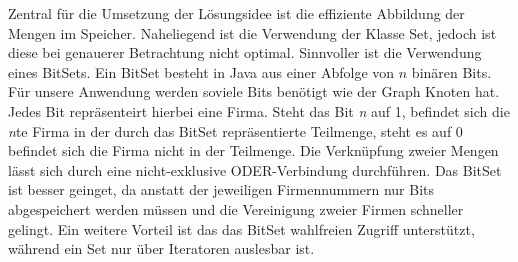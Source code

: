 Zentral für die Umsetzung der Lösungsidee ist die effiziente Abbildung der Mengen im Speicher. Naheliegend ist die Verwendung der Klasse Set, jedoch ist diese bei genauerer Betrachtung nicht optimal. Sinnvoller ist die Verwendung eines BitSets. Ein BitSet besteht in Java aus einer Abfolge von \(n\) binären Bits. Für unsere Anwendung werden soviele Bits benötigt wie der Graph Knoten hat. Jedes Bit repräsenteirt hierbei eine Firma. Steht das Bit \textit{n} auf 1, befindet sich die \textit{n}te Firma in der durch das BitSet repräsentierte Teilmenge, steht es auf 0 befindet sich die Firma nicht in der Teilmenge. Die Verknüpfung zweier Mengen lässt sich durch eine nicht-exklusive ODER-Verbindung durchführen. Das BitSet ist besser geinget, da anstatt der jeweiligen Firmennummern nur Bits abgespeichert werden müssen und die Vereinigung zweier Firmen schneller gelingt. Ein weitere Vorteil ist das das BitSet wahlfreien Zugriff unterstützt, während ein Set nur über Iteratoren auslesbar ist.